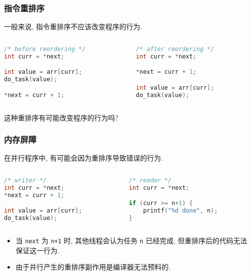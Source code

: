 \documentclass{ctexbeamer}
\newcommand{\ftitle}[1]{\frametitle{\hspace{4ex} {#1}}}
\begin{document}
\begin{frame}[fragile]
    \ftitle{指令重排序}
    一般来说, 指令重排序不应该改变程序的行为.
    \begin{columns}
        \begin{column}{.5\linewidth}
            \begin{lstlisting}[language=c++]
/* before reordering */
int curr = *next;

int value = arr[curr];
do_task(value);

*next = curr + 1;
            \end{lstlisting}
        \end{column}
        \begin{column}{.5\linewidth}
            \begin{lstlisting}[language=c++]
/* after reordering */
int curr = *next;

*next = curr + 1;

int value = arr[curr];
do_task(value);
            \end{lstlisting}
        \end{column}
    \end{columns}

     这种重排序有可能改变程序的行为吗?
\end{frame}

\begin{frame}[fragile]
    \ftitle{内存屏障}
    在并行程序中, 有可能会因为重排序导致错误的行为.

    \begin{columns}
        \begin{column}{.5\linewidth}
            \begin{lstlisting}[language=c++]
/* writer */
int curr = *next;
*next = curr + 1;

int value = arr[curr];
do_task(value);
            \end{lstlisting}
        \end{column}
        \begin{column}{.5\linewidth}
            \begin{lstlisting}[language=c++]
/* reader */
int curr = *next;

if (curr >= n+1) {
    printf("%d done", n);
}
            \end{lstlisting}
        \end{column}
    \end{columns}

    \begin{itemize}
        \item<3- > 当 \texttt{next} 为 \texttt{n+1} 时,
            其他线程会认为任务 \texttt{n} 已经完成,
            但重排序后的代码无法保证这一行为.
        \item<4- > 由于并行产生的重排序副作用是编译器无法预料的.
    \end{itemize}
\end{frame}
\end{document}
